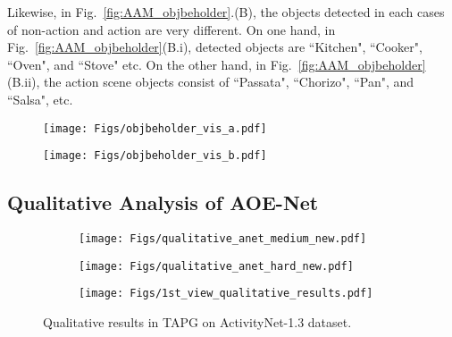 \documentclass[sn-mathphys]{sn-jnl}
\theoremstyle{thmstyleone}\newtheorem{theorem}{Theorem}\newtheorem{proposition}[theorem]{Proposition}
\theoremstyle{thmstyletwo}\newtheorem{example}{Example}\newtheorem{remark}{Remark}
\theoremstyle{thmstylethree}\newtheorem{definition}{Definition}
\begin{document}
\noindent Likewise, in Fig.~\ref{fig:AAM_objbeholder}.(B), the objects detected in each cases of non-action and action are very different. On one hand, in Fig.~\ref{fig:AAM_objbeholder}(B.i), detected objects are ``Kitchen", ``Cooker", ``Oven", and ``Stove" etc. On the other hand, in Fig.~\ref{fig:AAM_objbeholder}(B.ii), the action scene objects consist of ``Passata", ``Chorizo", ``Pan", and ``Salsa", etc.

\begin{figure*}[!ht]
     \centering
     \begin{subfigure}[b]{0.8\textwidth}
         \centering
         \texttt{[image: Figs/objbeholder\_vis\_a.pdf]}
         \label{fig:objbeh_1}
     \vspace{-3mm}
     \end{subfigure}
     \begin{subfigure}[b]{0.8\textwidth}
         \centering
         \texttt{[image: Figs/objbeholder\_vis\_b.pdf]}
         \label{fig:objbeh_2}
     \vspace{-3mm}
     \end{subfigure}
\caption{Qualitative results to illustrate the effectiveness of Objects Beholder with AAM in (A) videos with visible actors and (B) videos with non-visible actor. In each case, we illustrate two instances of having action and without action. The input frames are shown on the left, its objects detected by CLIP are shown in the middle, and the most relevant objects selected by AAM are shown in the right.}
\label{fig:AAM_objbeholder}
\end{figure*}

\subsection{Qualitative Analysis of AOE-Net}

\begin{figure}[!ht]
     \centering
     \begin{subfigure}[b]{0.8\textwidth}
         \centering
         \texttt{[image: Figs/qualitative\_anet\_medium\_new.pdf]}
         \label{fig:anet2}
     \vspace{-3mm}
     \end{subfigure}
     \begin{subfigure}[b]{0.8\textwidth}
         \centering
         \texttt{[image: Figs/qualitative\_anet\_hard\_new.pdf]}
         \label{fig:anet3}
     \vspace{-3mm}
     \end{subfigure}
     \begin{subfigure}[b]{0.8\textwidth}
         \centering
         \texttt{[image: Figs/1st\_view\_qualitative\_results.pdf]}
         \label{fig:anet4}
     \end{subfigure}
\vspace{-3mm}   
\caption{Qualitative results in TAPG on ActivityNet-1.3 \cite{caba2015activitynet} dataset.}
        \label{fig:qualitative_anet}
\end{figure}
\end{document}
